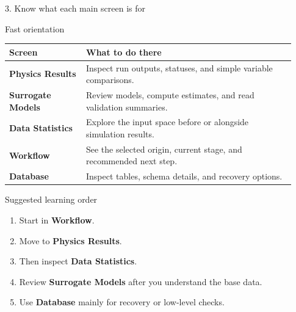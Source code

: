 \documentclass[aspectratio=169,11pt]{beamer}
\begin{document}
\begin{frame}{3. Know what each main screen is for}
  \begin{block}{Fast orientation}
    \scriptsize
    \begin{tabular}{>{\raggedright\arraybackslash}p{0.25\linewidth}>{\raggedright\arraybackslash}p{0.68\linewidth}}
      \toprule
      \textbf{Screen} & \textbf{What to do there} \\
      \midrule
      \textbf{Physics Results} & Inspect run outputs, statuses, and simple variable comparisons. \\
      \textbf{Surrogate Models} & Review models, compute estimates, and read validation summaries. \\
      \textbf{Data Statistics} & Explore the input space before or alongside simulation results. \\
      \textbf{Workflow} & See the selected origin, current stage, and recommended next step. \\
      \textbf{Database} & Inspect tables, schema details, and recovery options. \\
      \bottomrule
    \end{tabular}
  \end{block}

  \begin{block}{Suggested learning order}
    \small
    \begin{enumerate}
      \item Start in \textbf{Workflow}.
      \item Move to \textbf{Physics Results}.
      \item Then inspect \textbf{Data Statistics}.
      \item Review \textbf{Surrogate Models} after you understand the base data.
      \item Use \textbf{Database} mainly for recovery or low-level checks.
    \end{enumerate}
  \end{block}
\end{frame}
\end{document}
